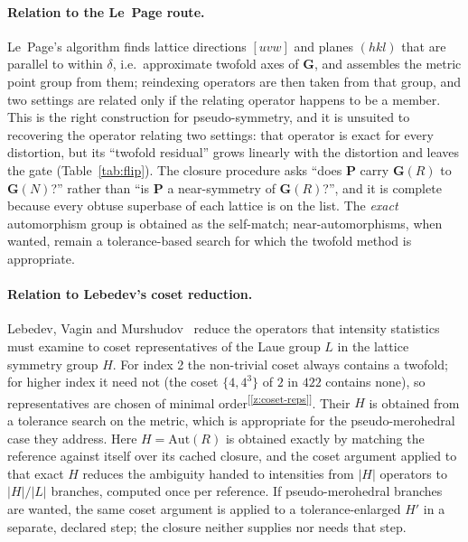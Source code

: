 \documentclass[11pt]{article}
\newcommand{\Gmet}{\mathbf{G}}
\newcommand{\Pop}{\mathbf{P}}
\newcommand{\chk}[1]{\textsuperscript{[\ref{#1}]}}
\begin{document}
\paragraph{Relation to the Le~Page route.}
Le~Page's algorithm finds lattice directions $[uvw]$ and planes $(hkl)$ that are parallel to within $\delta$, i.e.\ approximate twofold axes of $\Gmet$, and assembles the metric point group from them; reindexing operators are then taken from that group, and two settings are related only if the relating operator happens to be a member. This is the right construction for pseudo-symmetry, and it is unsuited to recovering the operator relating two settings: that operator is exact for every distortion, but its ``twofold residual'' grows linearly with the distortion and leaves the gate (Table~\ref{tab:flip}). The closure procedure asks ``does $\Pop$ carry $\Gmet(R)$ to $\Gmet(N)$?'' rather than ``is $\Pop$ a near-symmetry of $\Gmet(R)$?'', and it is complete because every obtuse superbase of each lattice is on the list. The \emph{exact} automorphism group is obtained as the self-match; near-automorphisms, when wanted, remain a tolerance-based search for which the twofold method is appropriate.

\paragraph{Relation to Lebedev's coset reduction.}
Lebedev, Vagin and Murshudov~\cite{lvm2006} reduce the operators that intensity statistics must examine to coset representatives of the Laue group $L$ in the lattice symmetry group $H$. For index 2 the non-trivial coset always contains a twofold; for higher index it need not (the coset $\{4,4^3\}$ of $2$ in $422$ contains none), so representatives are chosen of minimal order\chk{z:coset-reps}. Their $H$ is obtained from a tolerance search on the metric, which is appropriate for the pseudo-merohedral case they address. Here $H=\mathrm{Aut}(R)$ is obtained exactly by matching the reference against itself over its cached closure, and the coset argument applied to that exact $H$ reduces the ambiguity handed to intensities from $|H|$ operators to $|H|/|L|$ branches, computed once per reference. If pseudo-merohedral branches are wanted, the same coset argument is applied to a tolerance-enlarged $H'$ in a separate, declared step; the closure neither supplies nor needs that step.
\end{document}
